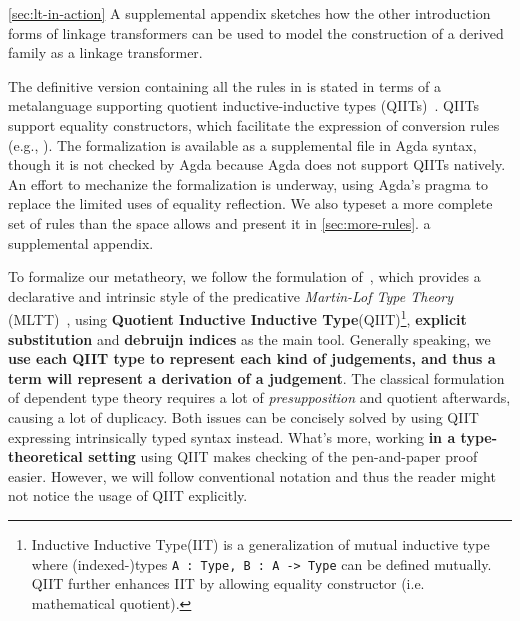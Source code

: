 \noindent


\noindent
\ifreport \cref{sec:lt-in-action}
\else A supplemental appendix
\fi
sketches how the other introduction forms of linkage transformers
can be used to model the construction of a derived family as a linkage transformer.


The definitive version containing all the rules in \TT is stated in
terms of a meta\-language supporting quotient inductive-inductive types
(QIITs)~\cite{nordvall2010inductive,altkap2016}.
QIITs support equality constructors, which facilitate the expression of
conversion rules (e.g., ).
The formalization is available as a supplemental file in Agda syntax,
though it is not checked by Agda because Agda does not support QIITs
natively.
An effort to mechanize the formalization is underway, using Agda's
 pragma to replace the limited uses of equality reflection.
%
We also typeset a more complete set of rules than the space allows and
present it in
\ifreport \cref{sec:more-rules}.
\else a supplemental appendix.
\fi



\ifShowOldWriting
\newpage

To formalize our metatheory, we follow the formulation of~\citet{altkap2016}, which provides a declarative and intrinsic style of the predicative \textit{Martin-Lof Type Theory} (MLTT)~\cite{martin1982constructive},
using \textbf{Quotient Inductive Inductive Type}(QIIT)\footnote{Inductive Inductive Type(IIT) is a generalization of mutual inductive type where (indexed-)types \texttt{A : Type, B : A -> Type} can be defined mutually. QIIT further enhances IIT by allowing equality constructor (i.e. mathematical quotient).}, \textbf{explicit substitution} and \textbf{debruijn indices} as the main tool. 
Generally speaking, we \textbf{use each QIIT type to represent each kind of judgements, and thus a term will represent a derivation of a judgement}. The classical formulation of dependent type theory requires a lot of \textit{presupposition} and quotient afterwards, causing a lot of duplicacy. Both issues can be concisely solved by using QIIT expressing intrinsically typed syntax instead. What's more, working \textbf{in a type-theoretical setting} using QIIT makes checking of the pen-and-paper proof easier. However, we will follow conventional notation and thus the reader might not notice the usage of QIIT explicitly.

